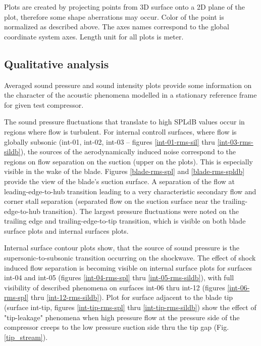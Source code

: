 Plots are created by projecting points from 3D surface onto a 2D plane of the plot, therefore some shape aberrations may occur. Color of the point is normalized as described above. The axes names correspond to the global coordinate system axes. Length unit for all plots is meter.

\subsection{Qualitative analysis} \label{rms_res_qual}
Averaged sound pressure and sound intensity plots provide some information on the character of the acoustic phenomena modelled in a stationary reference frame for given test compressor.

The sound pressure fluctuations that translate to high SPLdB values occur in regions where flow is turbulent. For internal controll surfaces, where flow is globally subsonic (int-01, int-02, int-03 -- figures \ref{int-01-rms-sil} thru \ref{int-03-rms-sildb}), the sources of the aerodynamically induced noise correspond to the regions on flow separation on the suction (upper on the plots). This is especially visible in the wake of the blade. Figures \ref{blade-rms-spl} and \ref{blade-rms-spldb} provide the view of the blade's suction surface. A separation of the flow at leading-edge-to-hub transition leading to a very characteristic secondary flow and corner stall separation (separated flow on the suction surface near the trailing-edge-to-hub transition). The largest pressure fluctuations were noted on the trailing edge and trailing-edge-to-tip transition, which is visible on both blade surface plots and internal surfaces plots.

Internal surface contour plots show, that the source of sound pressure is the supersonic-to-subsonic transition occurring on the shockwave. The effect of shock induced flow separation is becoming visible on internal surface plots for surfaces int-04 and int-05 (figures \ref{int-04-rms-spl} thru \ref{int-05-rms-sildb}), with full visibility of described phenomena on surfaces int-06 thru int-12 (figures \ref{int-06-rms-spl} thru \ref{int-12-rms-sildb}). Plot for surface adjacent to the blade tip (surface int-tip, figures \ref{int-tip-rms-spl} thru \ref{int-tip-rms-sildb}) show the effect of "tip-leakage" phenomena when high pressure flow at the pressure side of the compressor creeps to the low pressure suction side thru the tip gap (Fig. \ref{tip_stream}). 

